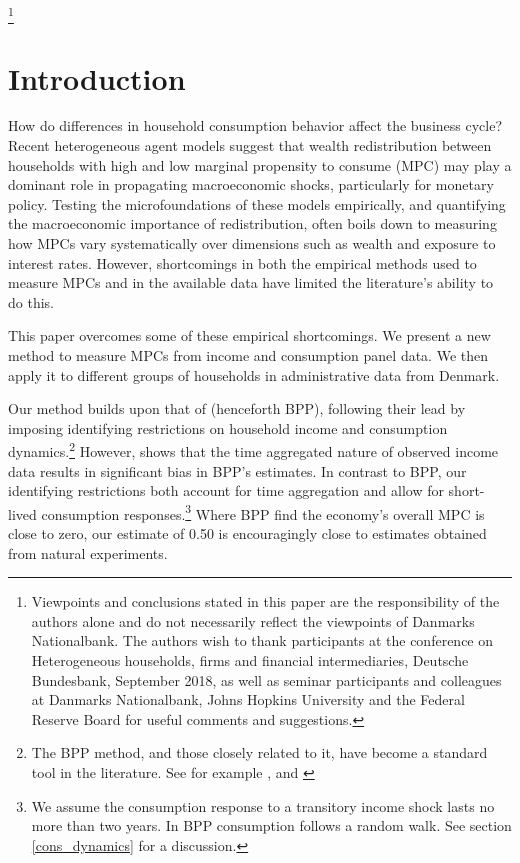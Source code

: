 \documentclass[titlepage]{\econtex}\newcommand{\texname}{ConsumptionHeterogeneity}
\begin{document}
\begin{authorsinfo}
\end{authorsinfo}
\thanks{Viewpoints and conclusions stated in this paper are the responsibility of the authors alone and do not necessarily reflect the viewpoints of Danmarks Nationalbank. The authors wish to thank participants at the conference on Heterogeneous households, firms and financial intermediaries, Deutsche Bundesbank, September 2018, as well as seminar participants and colleagues at Danmarks Nationalbank, Johns Hopkins University and the Federal Reserve Board for useful comments and suggestions.}

\titlepagefinish
\setcounter{page}{1}

\pagebreak
\section{Introduction}
How do differences in household consumption behavior affect the business cycle? Recent heterogeneous agent models suggest that wealth redistribution between households with high and low marginal propensity to consume (MPC) may play a dominant role in propagating macroeconomic shocks, particularly for monetary policy. Testing the microfoundations of these models empirically, and quantifying the macroeconomic importance of redistribution, often boils down to measuring how MPCs vary systematically over dimensions such as wealth and exposure to interest rates. However, shortcomings in both the empirical methods used to measure MPCs and in the available data have limited the literature's ability to do this.

This paper overcomes some of these empirical shortcomings. We present a new method to measure MPCs from income and consumption panel data. We then apply it to different groups of households in administrative data from Denmark.

Our method builds upon that of \cite{blundell_consumption_2008} (henceforth BPP), following their lead by imposing identifying restrictions on household income and consumption dynamics.\footnote{The BPP method, and those closely related to it, have become a standard tool in the literature. See for example \cite{violante_wealthy_2014}, \cite{auclert_monetary_2017} and \cite{manovskii_how_2017}} However, \cite{crawley_time_2018} shows that the time aggregated nature of observed income data results in significant bias in BPP's estimates. In contrast to BPP, our identifying restrictions both account for time aggregation and allow for short-lived consumption responses.\footnote{We assume the consumption response to a transitory income shock lasts no more than two years. In BPP consumption follows a random walk. See section \ref{cons_dynamics} for a discussion.} Where BPP find the economy's overall MPC is close to zero, our estimate of 0.50 is encouragingly close to estimates obtained from natural experiments.
\end{document}
